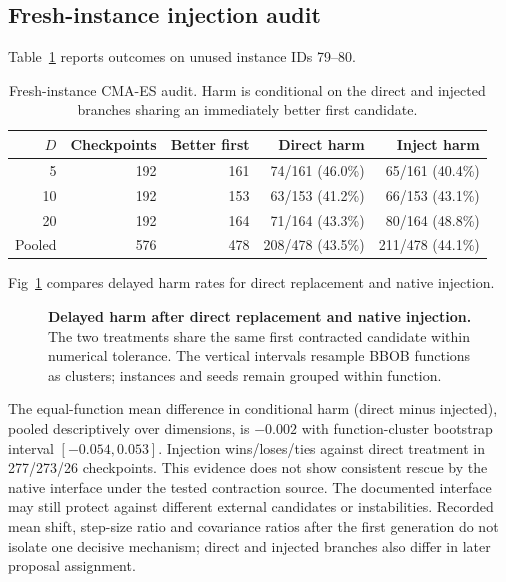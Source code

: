 \documentclass[10pt,letterpaper]{article}
\begin{document}
\subsection*{Fresh-instance injection audit}
Table~\ref{tab:inject} reports outcomes on unused instance IDs 79--80.
\begin{table}[!ht]\centering\small
\caption{Fresh-instance CMA-ES audit. Harm is conditional on the direct and injected branches sharing an immediately better first candidate.}
\label{tab:inject}
\begin{tabular}{rrrrr}\toprule
$D$ & Checkpoints & Better first & Direct harm & Inject harm\\\midrule
5 & 192 & 161 & 74/161 (46.0\%) & 65/161 (40.4\%)\\
10 & 192 & 153 & 63/153 (41.2\%) & 66/153 (43.1\%)\\
20 & 192 & 164 & 71/164 (43.3\%) & 80/164 (48.8\%)\\\midrule
Pooled & 576 & 478 & 208/478 (43.5\%) & 211/478 (44.1\%)\\\bottomrule
\end{tabular}\end{table}
Fig~\ref{fig:inject} compares delayed harm rates for direct replacement and native injection.
\begin{figure}[!h]\caption{\textbf{Delayed harm after direct replacement and native injection.} The two treatments share the same first contracted candidate within numerical tolerance. The vertical intervals resample BBOB functions as clusters; instances and seeds remain grouped within function.}\label{fig:inject}\end{figure}
The equal-function mean difference in conditional harm (direct minus injected), pooled descriptively over dimensions, is $-0.002$ with function-cluster bootstrap interval $[-0.054,0.053]$. Injection wins/loses/ties against direct treatment in 277/273/26 checkpoints. This evidence does not show consistent rescue by the native interface under the tested contraction source. The documented interface may still protect against different external candidates or instabilities. Recorded mean shift, step-size ratio and covariance ratios after the first generation do not isolate one decisive mechanism; direct and injected branches also differ in later proposal assignment.
\end{document}
